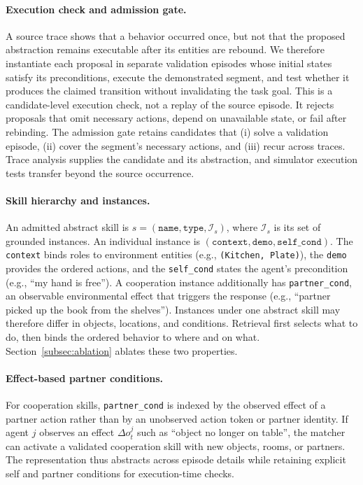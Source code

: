 \documentclass{article}
\theoremstyle{plain}
\theoremstyle{definition}
\theoremstyle{remark}
\begin{document}
\paragraph{Execution check and admission gate.}
A source trace shows that a behavior occurred once, but not that the proposed abstraction remains executable after its entities are rebound. We therefore instantiate each proposal in separate validation episodes whose initial states satisfy its preconditions, execute the demonstrated segment, and test whether it produces the claimed transition without invalidating the task goal. This is a candidate-level execution check, not a replay of the source episode. It rejects proposals that omit necessary actions, depend on unavailable state, or fail after rebinding. The admission gate retains candidates that (i) solve a validation episode, (ii) cover the segment's necessary actions, and (iii) recur across traces. Trace analysis supplies the candidate and its abstraction, and simulator execution tests transfer beyond the source occurrence.

\paragraph{Skill hierarchy and instances.}
An admitted abstract skill is $s=(\texttt{name},\texttt{type},\mathcal{I}_s)$, where $\mathcal{I}_s$ is its set of grounded instances. An individual instance is $(\texttt{context},\texttt{demo},\texttt{self\_cond})$. The \texttt{context} binds roles to environment entities (e.g., \texttt{(Kitchen, Plate)}), the \texttt{demo} provides the ordered actions, and the \texttt{self\_cond} states the agent's precondition (e.g., ``my hand is free''). A cooperation instance additionally has \texttt{partner\_cond}, an observable environmental effect that triggers the response (e.g., ``partner picked up the book from the shelves''). Instances under one abstract skill may therefore differ in objects, locations, and conditions. Retrieval first selects what to do, then binds the ordered behavior to where and on what. Section~\ref{subsec:ablation} ablates these two properties.

\paragraph{Effect-based partner conditions.}\label{subsec:effect_inference}
For cooperation skills, \texttt{partner\_cond} is indexed by the observed effect of a partner action rather than by an unobserved action token or partner identity. If agent $j$ observes an effect $\Delta o_t^j$ such as ``object no longer on table'', the matcher can activate a validated cooperation skill with new objects, rooms, or partners. The representation thus abstracts across episode details while retaining explicit self and partner conditions for execution-time checks.
 
\end{document}
